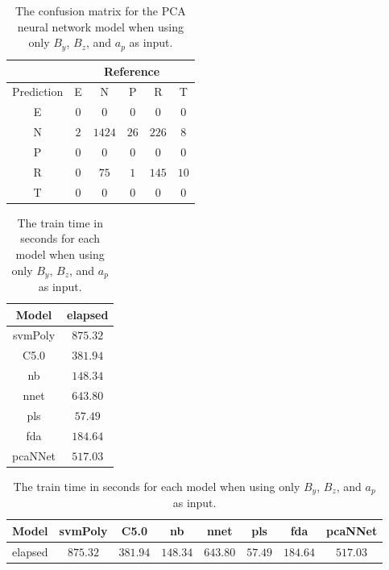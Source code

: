 \begin{table}[!ht]
	\centering
	\begin{tabular}{|c|c|c|c|c|c|}
		\hline
		 & \multicolumn{5}{|c|}{Reference} \\ \hline
		 Prediction & E & N & P & R & T \\ \hline
		 E & $0$ & $0$ & $0$ & $0$ & $0$ \\ \hline
		 N & $2$ & $1424$ & $26$ & $226$ & $8$ \\ \hline
		 P & $0$ & $0$ & $0$ & $0$ & $0$ \\ \hline
		 R & $0$ & $75$ & $1$ & $145$ & $10$ \\ \hline
		 T & $0$ & $0$ & $0$ & $0$ & $0$ \\ \hline
	\end{tabular}
	\caption{The confusion matrix for the PCA neural network model when using only $B_{y}$, $B_{z}$, and $a_{p}$ as input.}
	\label{tab:cm:yzap:pcaNNet}
\end{table}

\begin{table}[!ht]
	\centering
	\begin{tabular}{|c|c|}
		\hline
		Model & elapsed \\ \hline
		svmPoly & $875.32$ \\ \hline
		C5.0 & $381.94$ \\ \hline
		nb & $148.34$ \\ \hline
		nnet & $643.80$ \\ \hline
		pls & $57.49$ \\ \hline
		fda & $184.64$ \\ \hline
		pcaNNet & $517.03$ \\ \hline
	\end{tabular}
	\caption{The train time in seconds for each model when using only $B_{y}$, $B_{z}$, and $a_{p}$ as input.}
	\label{tab:time:yzap:train}
\end{table}

\begin{table}[!ht]
	\centering
	\begin{tabular}{|c|c|c|c|c|c|c|c|}
		\hline
		Model & svmPoly & C5.0 & nb & nnet & pls & fda & pcaNNet \\ \hline
		elapsed & $875.32$ & $381.94$ & $148.34$ & $643.80$ & $57.49$ & $184.64$ & $517.03$ \\ \hline
	\end{tabular}
	\caption{The train time in seconds for each model when using only $B_{y}$, $B_{z}$, and $a_{p}$ as input.}
	\label{tab:time:reverse:yzap:train}
\end{table}


